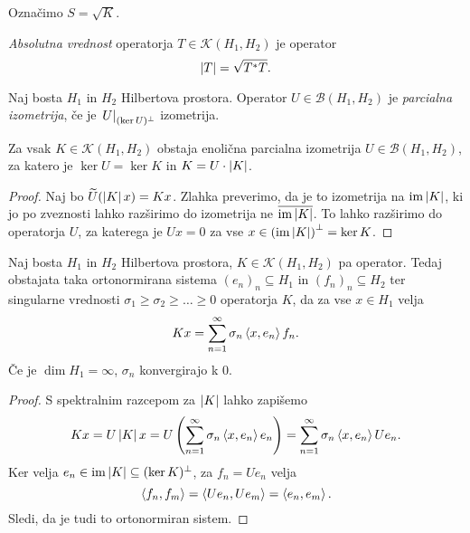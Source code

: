 \begin{opomba}
Označimo $S = \sqrt{K}$.
\end{opomba}

\begin{definicija}
\emph{Absolutna vrednost}
operatorja $T \in \mathcal{K}(H_1, H_2)$ je operator
\[
\left\lvert T\right\rvert = \sqrt{T^* T}.
\]
\end{definicija}

\begin{definicija}
Naj bosta $H_1$ in $H_2$ Hilbertova prostora. Operator
$U \in \mathcal{B}(H_1, H_2)$ je
\emph{parcialna izometrija},
če je $\left. U\right|_{(\ker U)^\bot}^{}$ izometrija.
\end{definicija}

\begin{izrek}
Za vsak $K \in \mathcal{K}(H_1, H_2)$ obstaja enolična parcialna
izometrija $U \in \mathcal{B}(H_1, H_2)$, za katero je
$\ker U = \ker K$ in $K = U \cdot \left\lvert K\right\rvert$.
\end{izrek}

\begin{proof}
Naj bo $\widetilde{U}(\left\lvert K\right\rvert x) = Kx$. Zlahka preverimo, da je to
izometrija na $\operatorname{im} \left\lvert K\right\rvert$, ki jo po zveznosti lahko razširimo do
izometrija ne $\overline{\operatorname{im} \left\lvert K\right\rvert}$. To lahko razširimo do
operatorja $U$, za katerega je $Ux = 0$ za vse
$x \in \left(\operatorname{im} \left\lvert K\right\rvert\right)^\bot = \ker K$.
\end{proof}

\begin{izrek}
Naj bosta $H_1$ in $H_2$ Hilbertova prostora,
$K \in \mathcal{K}(H_1, H_2)$ pa operator. Tedaj obstajata taka
ortonormirana sistema $(e_n)_n \subseteq H_1$ in
$(f_n)_n \subseteq H_2$ ter singularne vrednosti
$\sigma_1 \geq \sigma_2 \geq \dots \geq 0$ operatorja $K$, da za
vse $x \in H_1$ velja
\[
Kx = \sum_{n=1}^\infty \sigma_n \left\langle x, e_n\right\rangle f_n.
\]
Če je $\dim H_1 = \infty$, $\sigma_n$ konvergirajo k $0$.
\end{izrek}

\begin{proof}
S spektralnim razcepom za $\left\lvert K\right\rvert$ lahko zapišemo
\[
Kx =
U \left\lvert K\right\rvert x =
U \left(\sum_{n=1}^\infty \sigma_n \left\langle x, e_n\right\rangle e_n\right) =
\sum_{n=1}^\infty \sigma_n \left\langle x, e_n\right\rangle U e_n.
\]
Ker velja $e_n \in \operatorname{im} \left\lvert K\right\rvert \subseteq (\ker K)^\bot$, za
$f_n = U e_n$ velja
\[
\left\langle f_n, f_m\right\rangle = \left\langle U e_n, U e_m\right\rangle = \left\langle e_n, e_m\right\rangle.
\]
Sledi, da je tudi to ortonormiran sistem.
\end{proof}

